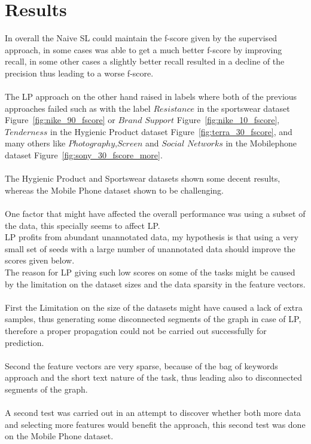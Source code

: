 \documentclass[4pt,a4paper,twocolumn]{article}
\begin{document}
\section{Results}
In overall the Naive SL could maintain the f-score given by the supervised approach, in some cases was able to get a much better f-score by improving recall, in some other cases a slightly better recall resulted in a decline of the precision thus leading to a worse f-score.\\
\\
The LP approach on the other hand raised in labels where both of the previous approaches failed such as with the label $Resistance$  in the sportswear dataset Figure~\ref{fig:nike_90_fscore} or $Brand$ $Support$ Figure~\ref{fig:nike_10_fscore},  $Tenderness$  in the Hygienic Product dataset Figure~\ref{fig:terra_30_fscore}, and many others like $Photography$,$Screen$ and $Social$ $Networks$ in the Mobilephone dataset Figure~\ref{fig:sony_30_fscore_more}.\\
\\
The Hygienic Product and Sportswear datasets shown some decent results, whereas the Mobile Phone dataset shown to be challenging.\\
\\
One factor that might have affected the overall performance was using a subset of the data, this specially seems to affect LP.\\
LP profits from abundant unannotated data, my hypothesis is that using a very small set of seeds with a large number of unannotated data should improve the scores given below.\\
The reason for LP giving such low scores  on some of the tasks might be caused by the limitation on the dataset sizes and the data sparsity in the feature vectors.\\
\\
First the Limitation on the size of the datasets might have caused a lack of extra samples, thus  generating some disconnected segments of the graph in case of LP, therefore a proper propagation could not be carried out successfully for prediction.\\
\\
Second the feature vectors are very sparse, because of the bag of keywords approach and the short text nature of the task, thus leading also to disconnected segments of the graph.\\
\\
A second test was carried out in an attempt to discover whether both more data and selecting more features would benefit the approach, this second test was done on the Mobile Phone dataset.\\
\end{document}
